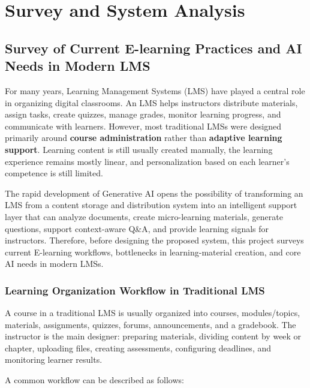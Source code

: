 \chapter{Survey and System Analysis}
\label{chap:khao-sat-phan-tich-he-thong}

\section{Survey of Current E-learning Practices and AI Needs in Modern LMS}
\label{sec:khao-sat-thuc-trang-elearning}

For many years, Learning Management Systems (LMS) have played a central role
in organizing digital classrooms. An LMS helps instructors distribute
materials, assign tasks, create quizzes, manage grades, monitor learning
progress, and communicate with learners. However, most traditional LMSs were
designed primarily around \textbf{course administration} rather than
\textbf{adaptive learning support}. Learning content is still usually created
manually, the learning experience remains mostly linear, and personalization
based on each learner's competence is still limited.

The rapid development of Generative AI opens the possibility of transforming an
LMS from a content storage and distribution system into an intelligent support
layer that can analyze documents, create micro-learning materials, generate
questions, support context-aware Q\&A, and provide learning signals for
instructors. Therefore, before designing the proposed system, this project
surveys current E-learning workflows, bottlenecks in learning-material
creation, and core AI needs in modern LMSs.

\subsection{Learning Organization Workflow in Traditional LMS}

A course in a traditional LMS is usually organized into courses,
modules/topics, materials, assignments, quizzes, forums, announcements, and a
gradebook. The instructor is the main designer: preparing materials, dividing
content by week or chapter, uploading files, creating assessments, configuring
deadlines, and monitoring learner results.

A common workflow can be described as follows:

